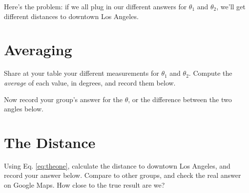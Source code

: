 \documentclass{article}
\begin{document}
Here's the problem: if we all plug in our different answers for $\theta_1$ and $\theta_2$, we'll get different distances to downtown Los Angeles.

\section{Averaging}

Share at your table your different measurements for $\theta_1$ and $\theta_2$.  Compute the \textit{average} of each value, in degrees, and record them below.  \\ \vspace{0.5cm}

Now record your group's answer for the $\theta$, or the difference between the two angles below. \\ \vspace{0.5cm}

\section{The Distance}

Using Eq. \ref{eq:theone}, calculate the distance to downtown Los Angeles, and record your answer below.  Compare to other groups, and check the real answer on Google Maps.  How close to the true result are we?
\end{document}
